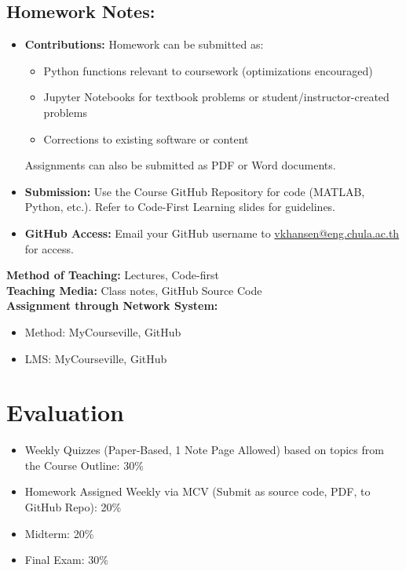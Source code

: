\documentclass{article}
\begin{document}
\begin{enumerate}
\subsection*{Homework Notes:}
\begin{itemize}
    \item \textbf{Contributions:} Homework can be submitted as:
        \begin{itemize}
            \item Python functions relevant to coursework (optimizations encouraged)
            \item Jupyter Notebooks for textbook problems or student/instructor-created problems
            \item Corrections to existing software or content
        \end{itemize}
        Assignments can also be submitted as PDF or Word documents.
    \item \textbf{Submission:} Use the Course GitHub Repository for code (MATLAB, Python, etc.). Refer to Code-First Learning slides for guidelines.
    \item \textbf{GitHub Access:} Email your GitHub username to \href{mailto:vkhansen@eng.chula.ac.th}{vkhansen@eng.chula.ac.th} for access.
\end{itemize}

\textbf{Method of Teaching:} Lectures, Code-first \\
\textbf{Teaching Media:} Class notes, GitHub Source Code \\
\textbf{Assignment through Network System:}
\begin{itemize}
    \item Method: MyCourseville, GitHub
    \item LMS: MyCourseville, GitHub
\end{itemize}

\section*{Evaluation}
\begin{itemize}
    \item Weekly Quizzes (Paper-Based, 1 Note Page Allowed) based on topics from the Course Outline: 30\%
    \item Homework Assigned Weekly via MCV (Submit as source code, PDF, to GitHub Repo): 20\%
    \item Midterm: 20\%
    \item Final Exam: 30\%
\end{itemize}


\end{enumerate}
\end{document}
